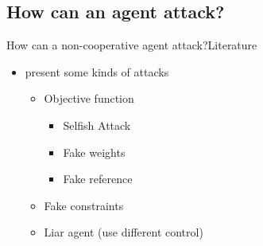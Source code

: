 \documentclass[aspectratio=169]{beamer}
\begin{document}
\subsection{How can an agent attack?}
\begin{frame}{How can a non-cooperative agent attack?}{Literature}

    \begin{itemize}
      \item<1-> \cite{VelardeEtAl2017a,ChanfreutEtAl2018} present some kinds of attacks
            \begin{itemize}
              \item<2-> Objective function
                    \begin{itemize}
                      \item<3-> Selfish Attack
                      \item<4-> Fake weights
                      \item<5-> Fake reference
                    \end{itemize}
              \item<6-> Fake constraints
              \item<7-> Liar agent (use different control)
            \end{itemize}
    \end{itemize}

\end{frame}
\end{document}
